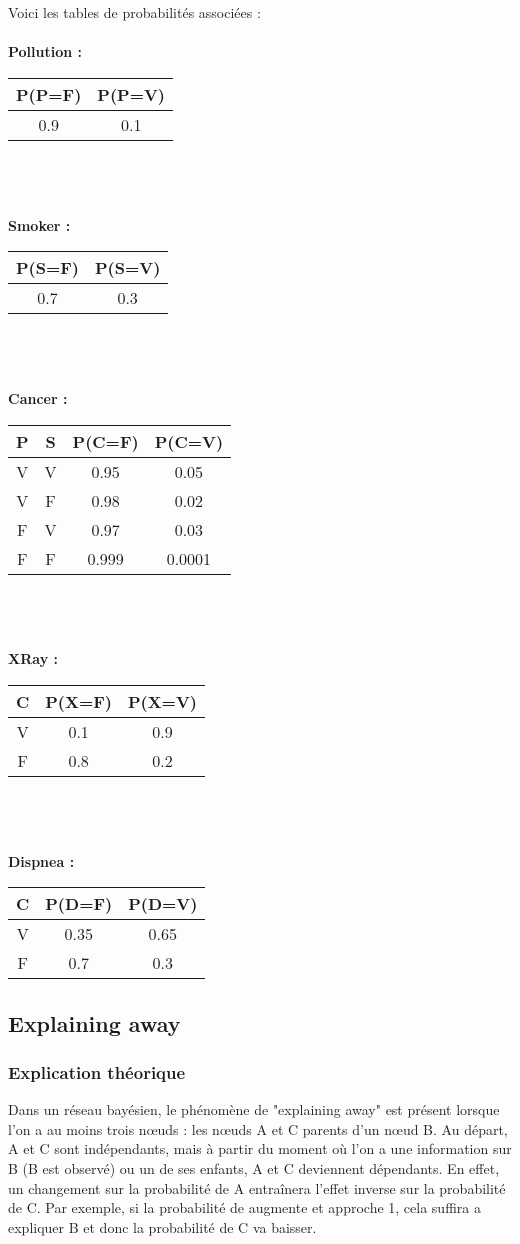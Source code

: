 \documentclass[12pt]{article}
\begin{document}
Voici les tables de probabilités associées : 
\\
\\
\textbf{Pollution :}
\begin{tabular}{|c|c|}
  \hline
  P(P=F) & P(P=V) \\
  \hline
  0.9 & 0.1 \\
  \hline
\end{tabular}
\\
\\
\\
\textbf{Smoker :}
\begin{tabular}{|c|c|}
  \hline
  P(S=F) & P(S=V) \\
  \hline
  0.7 & 0.3 \\
  \hline
\end{tabular}
\\
\\
\\
\textbf{Cancer :  }
\begin{tabular}{|c|c|c|c|}
  \hline
  P & S & P(C=F) & P(C=V) \\
  \hline
  V & V & 0.95 & 0.05 \\
  V & F & 0.98 & 0.02 \\
  F & V & 0.97 & 0.03 \\
  F & F & 0.999& 0.0001 \\
  \hline
\end{tabular}
\\
\\
\\
\textbf{XRay :}
\begin{tabular}{|c|c|c|}
  \hline
  C & P(X=F) & P(X=V) \\
  \hline
  V & 0.1 & 0.9 \\
  F & 0.8 & 0.2 \\
  \hline
\end{tabular}
\\
\\
\\
\textbf{Dispnea :}
\begin{tabular}{|c|c|c|}
  \hline
  C & P(D=F) & P(D=V)\\
  \hline
  V & 0.35 & 0.65 \\
  F & 0.7 & 0.3 \\
  \hline
\end{tabular}
\subsection{Explaining away}
\subsubsection{Explication théorique}
Dans un réseau bayésien, le phénomène de "explaining away" est présent lorsque l'on a au moins trois nœuds : les nœuds A et C parents d'un nœud B. Au départ, A et C sont indépendants, mais à partir du moment où l'on a une information sur B (B est observé) ou un de ses enfants, A et C deviennent dépendants. En effet, un changement sur la probabilité de A entraînera l'effet inverse sur la probabilité de C. Par exemple, si la probabilité de augmente et approche 1, cela suffira a expliquer B et donc la probabilité de C va baisser.
\end{document}
